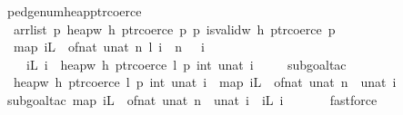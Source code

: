 \begin{isabellebody}
%
\endisadelimproof
\isanewline
{}\isamarkupfalse%
\ pedge{\isacharunderscore}num{\isacharunderscore}heap{\isacharunderscore}ptr{\isacharunderscore}coerce{\isacharcolon}\isanewline
\ \ {\isachardoublequoteopen}{\isasymlbrakk}arrlist\ {\isacharparenleft}{\isasymlambda}p{\isachardot}\ heap{\isacharunderscore}w{}{}\ h\ {\isacharparenleft}ptr{\isacharunderscore}coerce\ p{\isacharparenright}{\isacharparenright}\ {\isacharparenleft}{\isasymlambda}p{\isachardot}\ is{\isacharunderscore}valid{\isacharunderscore}w{}{}\ h\ {\isacharparenleft}ptr{\isacharunderscore}coerce\ p{\isacharparenright}{\isacharparenright}\ \isanewline
\ \ {\isacharparenleft}map\ {\isacharparenleft}iL\ {\isasymcirc}\ of{\isacharunderscore}nat{\isacharparenright}\ {\isacharbrackleft}{}{\isachardot}{\isachardot}{\isacharless}unat\ n{\isacharbrackright}{\isacharparenright}\ l{\isacharsemicolon}\ i\ {\isacharless}\ n{\isacharsemicolon}\ {}\ {\isasymle}\ i{\isasymrbrakk}\ {\isasymLongrightarrow}\isanewline
\ \ \ \ iL\ i\ {\isacharequal}\ heap{\isacharunderscore}w{}{}\ h\ {\isacharparenleft}ptr{\isacharunderscore}coerce\ {\isacharparenleft}l\ {\isacharplus}\isactrlsub p\ int\ {\isacharparenleft}unat\ i{\isacharparenright}{\isacharparenright}{\isacharparenright}{\isachardoublequoteclose}\ \isanewline
%
\isadelimproof
\ \ %
\endisadelimproof
%
\isatagproof
{}\isamarkupfalse%
\ {\isacharparenleft}subgoal{\isacharunderscore}tac\ \isanewline
\ \ {\isachardoublequoteopen}heap{\isacharunderscore}w{}{}\ h\ {\isacharparenleft}ptr{\isacharunderscore}coerce\ {\isacharparenleft}l\ {\isacharplus}\isactrlsub p\ int\ {\isacharparenleft}unat\ i{\isacharparenright}{\isacharparenright}{\isacharparenright}\ {\isacharequal}\ map\ {\isacharparenleft}iL\ {\isasymcirc}\ of{\isacharunderscore}nat{\isacharparenright}\ {\isacharbrackleft}{}{\isachardot}{\isachardot}{\isacharless}unat\ n{\isacharbrackright}\ {\isacharbang}\ unat\ i{\isachardoublequoteclose}{\isacharparenright}\ \isanewline
\ \ \ \isamarkupfalse%
\ {\isacharparenleft}subgoal{\isacharunderscore}tac\ {\isachardoublequoteopen}map\ {\isacharparenleft}iL\ {\isasymcirc}\ of{\isacharunderscore}nat{\isacharparenright}\ {\isacharbrackleft}{}{\isachardot}{\isachardot}{\isacharless}unat\ n{\isacharbrackright}\ {\isacharbang}\ unat\ i\ {\isacharequal}\ iL\ i{\isachardoublequoteclose}{\isacharparenright}\ \isanewline
\ \ \ \ \isamarkupfalse%
\ fastforce\isanewline

\end{isabellebody}

